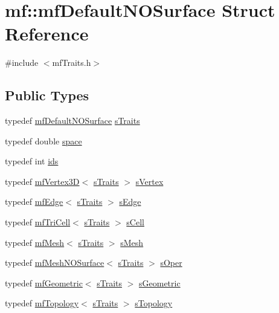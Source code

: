 \hypertarget{structmf_1_1mfDefaultNOSurface}{
\section{mf::mfDefaultNOSurface Struct Reference}
\label{structmf_1_1mfDefaultNOSurface}
}


{\ttfamily \#include $<$mfTraits.h$>$}

\subsection*{Public Types}
\begin{DoxyCompactItemize}
\item 
typedef \hyperlink{structmf_1_1mfDefaultNOSurface}{mfDefaultNOSurface} \hyperlink{structmf_1_1mfDefaultNOSurface_a91330a9e2b3b15a4d53b8ca6b5039cf5}{sTraits}
\item 
typedef double \hyperlink{structmf_1_1mfDefaultNOSurface_a2b24d2ce49359b64bad77bdd4445b898}{space}
\item 
typedef int \hyperlink{structmf_1_1mfDefaultNOSurface_ac58ec97d7e38e086302584b5dbb97623}{ids}
\item 
typedef \hyperlink{classmf_1_1mfVertex3D}{mfVertex3D}$<$ \hyperlink{structmf_1_1mfDefaultNOSurface}{sTraits} $>$ \hyperlink{structmf_1_1mfDefaultNOSurface_a5dc1689ac66df10160905f65483dba3d}{sVertex}
\item 
typedef \hyperlink{classmf_1_1mfEdge}{mfEdge}$<$ \hyperlink{structmf_1_1mfDefaultNOSurface}{sTraits} $>$ \hyperlink{structmf_1_1mfDefaultNOSurface_aad9994803ba08e95add562c846911c2b}{sEdge}
\item 
typedef \hyperlink{classmf_1_1mfTriCell}{mfTriCell}$<$ \hyperlink{structmf_1_1mfDefaultNOSurface}{sTraits} $>$ \hyperlink{structmf_1_1mfDefaultNOSurface_ab1d49410badd1f63e8adaa6699c11d49}{sCell}
\item 
typedef \hyperlink{classmf_1_1mfMesh}{mfMesh}$<$ \hyperlink{structmf_1_1mfDefaultNOSurface}{sTraits} $>$ \hyperlink{structmf_1_1mfDefaultNOSurface_ab43f8d1b8feef2cb5af881c7797394e5}{sMesh}
\item 
typedef \hyperlink{classmf_1_1mfMeshNOSurface}{mfMeshNOSurface}$<$ \hyperlink{structmf_1_1mfDefaultNOSurface}{sTraits} $>$ \hyperlink{structmf_1_1mfDefaultNOSurface_acec2a5d3a83303d226579c67623e00da}{sOper}
\item 
typedef \hyperlink{classmf_1_1mfGeometric}{mfGeometric}$<$ \hyperlink{structmf_1_1mfDefaultNOSurface}{sTraits} $>$ \hyperlink{structmf_1_1mfDefaultNOSurface_abf5459ce8e84b8a2d7635196ee2efe46}{sGeometric}
\item 
typedef \hyperlink{classmf_1_1mfTopology}{mfTopology}$<$ \hyperlink{structmf_1_1mfDefaultNOSurface}{sTraits} $>$ \hyperlink{structmf_1_1mfDefaultNOSurface_a928af564fa895db27f7d9f6db03a535a}{sTopology}
\end{DoxyCompactItemize}



